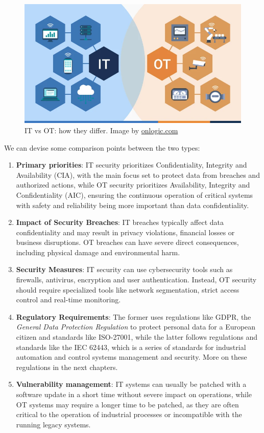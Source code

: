 \begin{figure}[h]
  \centering
  \includegraphics[width=1.0\textwidth]{chapters/02/assets/it-ot-diff.jpg}
  \caption[IT vs OT: how they differ. Image by onlogic.com]{IT vs OT: how they differ. Image by \url{onlogic.com}}
  \label{fig:it-ot-diff}
\end{figure}

We can devise some comparison points between the two types:
\begin{enumerate}
  \item \textbf{Primary priorities}: IT security prioritizes Confidentiality, Integrity and Availability (CIA), with the main focus set to protect data from breaches and authorized actions, while OT security prioritizes Availability, Integrity and Confidentiality (AIC), ensuring the continuous operation of critical systems with safety and reliability being more important than data confidentiality.
  \item \textbf{Impact of Security Breaches}: IT breaches typically affect data confidentiality and may result in privacy violations, financial losses or business disruptions. OT breaches can have severe direct consequences, including physical damage and environmental harm.
  \item \textbf{Security Measures}: IT security can use cybersecurity tools such as firewalls, antivirus, encryption and user authentication. Instead, OT security should require specialized tools like network segmentation, strict access control and real-time monitoring.
  \item \textbf{Regulatory Requirements}: The former uses regulations like GDPR, the \textit{General Data Protection Regulation} to protect personal data for a European citizen and standards like ISO-27001, while the latter follows regulations and standards like the IEC 62443, which is a series of standards for industrial automation and control systems management and security. More on these regulations in the next chapters.
  \item \textbf{Vulnerability management}: IT systems can usually be patched with a software update in a short time without severe impact on operations, while OT systems may require a longer time to be patched, as they are often critical to the operation of industrial processes or incompatible with the running legacy systems.
\end{enumerate}

